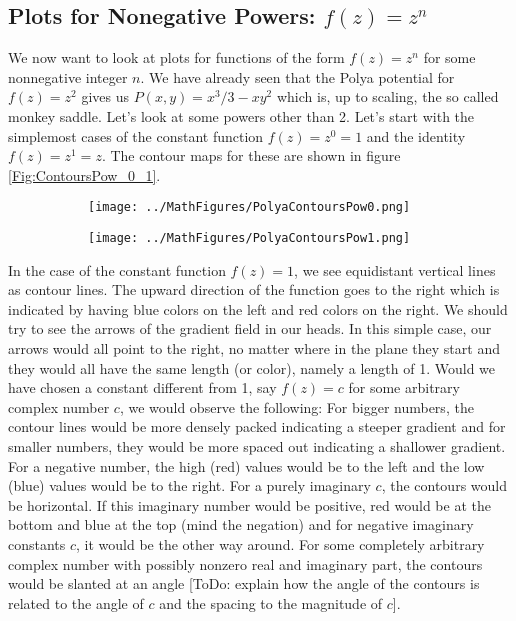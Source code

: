 \documentclass[12pt]{article}
\begin{document}



\subsection{Plots for Nonegative Powers: $f(z) = z^n$}
We now want to look at plots for functions of the form $f(z) = z^n$ for some nonnegative integer $n$. We have already seen that the Polya potential for $f(z) = z^2$ gives us $P(x,y) = x^3/ 3 - x y^2$ which is, up to scaling, the so called monkey saddle. Let's look at some powers other than 2. Let's start with the simplemost cases of the constant function $f(z) = z^0 = 1$ and the identity $f(z) = z^1 = z$. The contour maps for these are shown in figure \ref{Fig:ContoursPow_0_1}. 
\begin{figure}[p]
\caption{Polya potential contours of $f(z) = z^0$ and $f(z) = z^1$}	
\label{Fig:ContoursPow_0_1}	
\centering
\begin{subfigure}[b]{0.49\textwidth}
\centering
\texttt{[image: ../MathFigures/PolyaContoursPow0.png]}
\end{subfigure}
\begin{subfigure}[b]{0.49\textwidth}
\centering
\texttt{[image: ../MathFigures/PolyaContoursPow1.png]}
\end{subfigure}
\end{figure}

\medskip
In the case of the constant function $f(z) = 1$, we see equidistant vertical lines as contour lines. The upward direction of the function goes to the right which is indicated by having blue colors on the left and red colors on the right. We should try to see the arrows of the gradient field in our heads. In this simple case, our arrows would all point to the right, no matter where in the plane they start and they would all have the same length (or color), namely a length of 1. Would we have chosen a constant different from 1, say $f(z) = c$ for some arbitrary complex number $c$, we would observe the following: For bigger numbers, the contour lines would be more densely packed indicating a steeper gradient and for smaller numbers, they would be more spaced out indicating a shallower gradient. For a negative number, the high (red) values would be to the left and the low (blue) values would be to the right. For a purely imaginary $c$, the contours would be horizontal. If this imaginary number would be positive, red would be at the bottom and blue at the top (mind the negation) and for negative imaginary constants $c$, it would be the other way around. For some completely arbitrary complex number with possibly nonzero real and imaginary part, the contours would be slanted at an angle [ToDo: explain how the angle of the contours is related to the angle of $c$ and the spacing to the magnitude of $c$]. 
\end{document}
